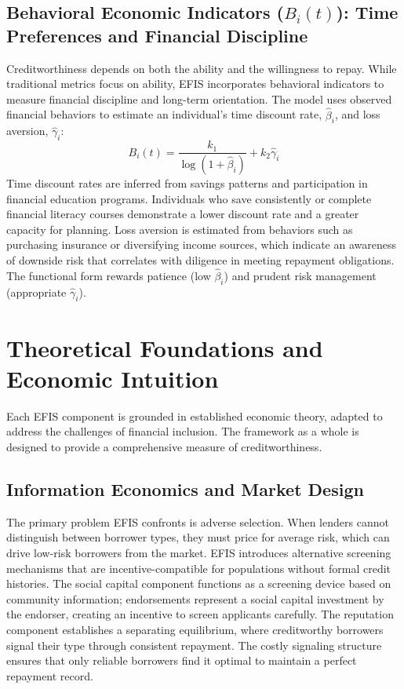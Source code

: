 \documentclass{article}
\begin{document}
\subsection{Behavioral Economic Indicators ($B_i(t)$): Time Preferences and Financial Discipline}

Creditworthiness depends on both the ability and the willingness to repay. While traditional metrics focus on ability, EFIS incorporates behavioral indicators to measure financial discipline and long-term orientation. The model uses observed financial behaviors to estimate an individual's time discount rate, $\hat{\beta}_i$, and loss aversion, $\hat{\gamma}_i$:
$$
B_i(t) = \frac{k_1}{\log(1+\hat{\beta}_i)} + k_2 \hat{\gamma}_i
$$
Time discount rates are inferred from savings patterns and participation in financial education programs. Individuals who save consistently or complete financial literacy courses demonstrate a lower discount rate and a greater capacity for planning. Loss aversion is estimated from behaviors such as purchasing insurance or diversifying income sources, which indicate an awareness of downside risk that correlates with diligence in meeting repayment obligations. The functional form rewards patience (low $\hat{\beta}_i$) and prudent risk management (appropriate $\hat{\gamma}_i$).

\section{Theoretical Foundations and Economic Intuition}

Each EFIS component is grounded in established economic theory, adapted to address the challenges of financial inclusion. The framework as a whole is designed to provide a comprehensive measure of creditworthiness.

\subsection{Information Economics and Market Design}

The primary problem EFIS confronts is adverse selection. When lenders cannot distinguish between borrower types, they must price for average risk, which can drive low-risk borrowers from the market. EFIS introduces alternative screening mechanisms that are incentive-compatible for populations without formal credit histories. The social capital component functions as a screening device based on community information; endorsements represent a social capital investment by the endorser, creating an incentive to screen applicants carefully. The reputation component establishes a separating equilibrium, where creditworthy borrowers signal their type through consistent repayment. The costly signaling structure ensures that only reliable borrowers find it optimal to maintain a perfect repayment record.
\end{document}
